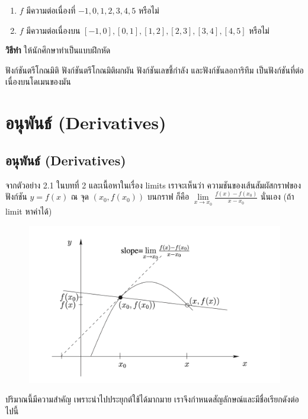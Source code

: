 \documentclass[
]{book}
\providecommand{\tightlist}{%
  \setlength{\itemsep}{0pt}\setlength{\parskip}{0pt}}
\begin{document}
\begin{enumerate}
\def\labelenumi{\arabic{enumi}.}
\tightlist
\item
  \(f\) มีความต่อเนื่องที่ \(-1,0,1,2,3,4,5\) หรือไม่\\
\item
  \(f\) มีความต่อเนื่องบน
  \(\left[ -1,0\right] ,\left[ 0,1\right] ,\left[ 1,2\right] ,\left[ 2,3\right] ,\left[ 3,4\right] ,\left[ 4,5\right]\)
  หรือไม่
\end{enumerate}

\textbf{วิธีทำ} ให้นักศึกษาทำเป็นแบบฝึกหัด

\label{thm-cont-5}
ฟังก์ชันตรีโกณมิติ ฟังก์ชันตรีโกณมิติผกผัน ฟังก์ชันเลขชี้กำลัง และฟังก์ชันลอการิทึม
เป็นฟังก์ชันที่ต่อเนื่องบนโดเมนของมัน

\chapter{อนุพันธ์
(Derivatives)}\label{uxe2duxe19uxe1euxe19uxe18-derivatives}

\section{อนุพันธ์
(Derivatives)}\label{uxe2duxe19uxe1euxe19uxe18-derivatives-1}

จากตัวอย่าง 2.1 ในบทที่ 2 และเนื้อหาในเรื่อง limits เราจะเห็นว่า
ความชันของเส้นสัมผัสกราฟของฟังก์ชัน \(y=f\left( x\right)\) ณ จุด
\(\left( x_{0},f\left( x_{0}\right) \right)\) บนกราฟ ก็คือ
\(\underset{x\rightarrow x_{0}}{\lim}\frac{f\left( x\right) -f\left( x_{0}\right) }{x-x_{0}}\)
นั่นเอง (ถ้า limit หาค่าได้)

\begin{figure}

{\centering \includegraphics[width=0.5\linewidth]{images/fig-derivative-1} 

}

\end{figure}

ปริมาณนี้มีความสำคัญ เพราะนำไปประยุกต์ใช้ได้มากมาย
เราจึงกำหนดสัญลักษณ์และมีชื่อเรียกดังต่อไปนี้
\end{document}
